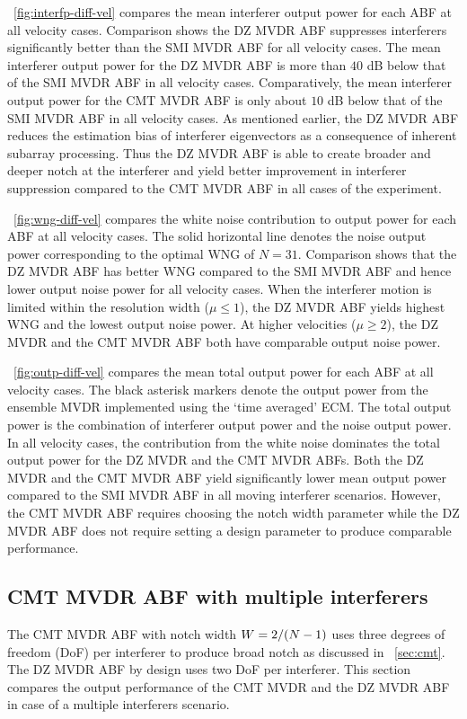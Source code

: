 \figurename{}~\ref{fig:interfp-diff-vel} compares the mean interferer output power for each ABF at all velocity cases. Comparison shows the DZ MVDR ABF
suppresses interferers significantly better than the SMI MVDR ABF for
all velocity cases. The mean interferer output power for the DZ MVDR
ABF is more than $40$ dB below that of the SMI MVDR ABF in all
velocity cases. Comparatively, the mean interferer output power for
the CMT MVDR ABF is only about $10$ dB below that of the SMI MVDR ABF
in all velocity cases. As mentioned earlier, the DZ MVDR ABF reduces
the estimation bias of interferer eigenvectors as a consequence of
inherent subarray processing. Thus the DZ MVDR ABF is able to create
broader and deeper notch at the interferer and yield better
improvement in interferer suppression compared to the CMT MVDR ABF in
all cases of the experiment.

\figurename{}~\ref{fig:wng-diff-vel} compares the white noise
contribution to output power for each ABF at all velocity cases. The
solid horizontal line denotes the noise output power corresponding to
the optimal WNG of $N = 31$. Comparison shows that the DZ MVDR ABF has
better WNG compared to the SMI MVDR ABF and hence lower output noise
power for all velocity cases. When the interferer motion is limited
within the resolution width ($\mu \leq 1$), the DZ MVDR ABF yields
highest WNG and the lowest output noise power. At higher velocities
($\mu \geq 2$), the DZ MVDR and the CMT MVDR ABF both have comparable
output noise power. 

\figurename{}~\ref{fig:outp-diff-vel} compares the mean total output
power for each ABF at all velocity cases. The black asterisk markers
denote the output power from the ensemble MVDR implemented using the
`time averaged' ECM. The total output power is the combination of
interferer output power and the noise output power. In all velocity
cases, the contribution from the white noise dominates the total
output power for the DZ MVDR and the CMT MVDR ABFs. Both the DZ MVDR
and the CMT MVDR ABF yield significantly lower mean output power
compared to the SMI MVDR ABF in all moving interferer scenarios.
However, the CMT MVDR ABF requires choosing the notch width
parameter while the DZ MVDR ABF does not require setting a design
parameter to produce comparable performance.

\subsection{CMT MVDR ABF with multiple interferers}
\label{sec:cmt-multi-interf}
The CMT MVDR ABF with notch width $W = 2/(N-1)$ uses three degrees
of freedom (DoF) per interferer to produce broad notch as discussed in
\sect{}~\ref{sec:cmt}. The DZ MVDR ABF by design uses two DoF per
interferer. This section compares the output performance of the CMT
MVDR and the DZ MVDR ABF in case of a multiple interferers scenario.

